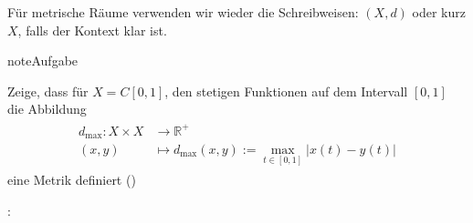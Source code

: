 \documentclass[letterpaper,10pt,english]{jupyterBook}
\begin{document}
Für metrische Räume verwenden wir wieder die Schreibweisen: \((X, d)\) oder kurz \(X\), falls der Kontext klar ist.

\begin{sphinxadmonition}{note}{Aufgabe}

Zeige, dass für \(X = C[0,1]\), den stetigen Funktionen auf dem Intervall \([0,1]\) die Abbildung
\begin{equation*}
\begin{split}\begin{split}d_{\text{max}} : X \times X & \to \mathbb{R}^+\\
(x,y) & \mapsto d_{\text{max}}(x,y) := \max_{t\in[0,1]} |x(t)-y(t)|\end{split}\end{split}
\end{equation*}
eine Metrik definiert ()
\end{sphinxadmonition}

:

\begin{sphinxVerbatim}[commandchars=\\\{\}]
   
   

    
    

  

 
 
\end{sphinxVerbatim}
\end{document}
